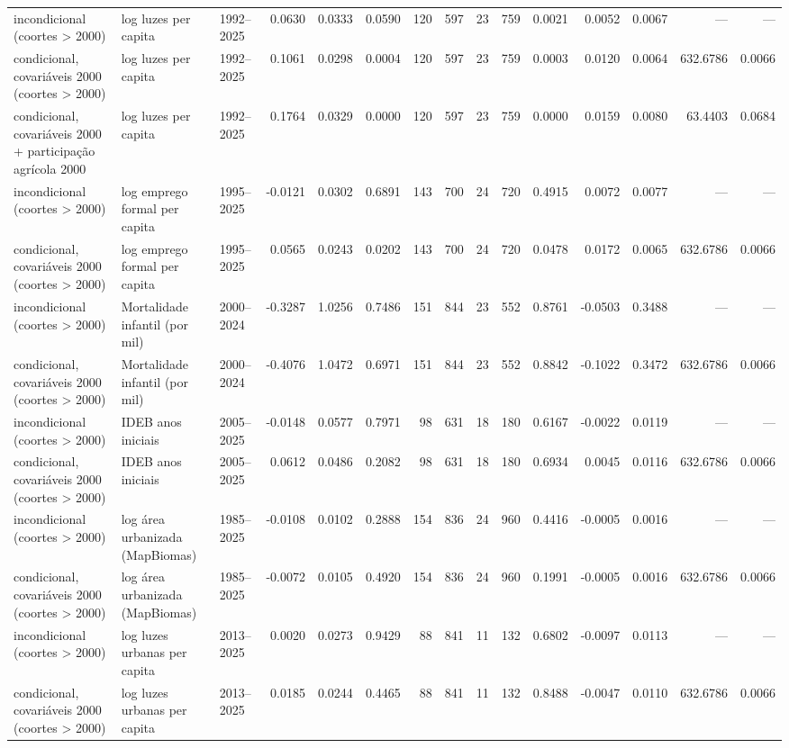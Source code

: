 \begin{table}
\begin{tabular}{lllrrrrrrrrrrrr}
incondicional (coortes > 2000) & log luzes per capita & 1992–2025 & 0.0630 & 0.0333 & 0.0590 & 120 & 597 & 23 & 759 & 0.0021 & 0.0052 & 0.0067 & — & — \\
condicional, covariáveis 2000 (coortes > 2000) & log luzes per capita & 1992–2025 & 0.1061 & 0.0298 & 0.0004 & 120 & 597 & 23 & 759 & 0.0003 & 0.0120 & 0.0064 & 632.6786 & 0.0066 \\
condicional, covariáveis 2000 + participação agrícola 2000 & log luzes per capita & 1992–2025 & 0.1764 & 0.0329 & 0.0000 & 120 & 597 & 23 & 759 & 0.0000 & 0.0159 & 0.0080 & 63.4403 & 0.0684 \\
incondicional (coortes > 2000) & log emprego formal per capita & 1995–2025 & -0.0121 & 0.0302 & 0.6891 & 143 & 700 & 24 & 720 & 0.4915 & 0.0072 & 0.0077 & — & — \\
condicional, covariáveis 2000 (coortes > 2000) & log emprego formal per capita & 1995–2025 & 0.0565 & 0.0243 & 0.0202 & 143 & 700 & 24 & 720 & 0.0478 & 0.0172 & 0.0065 & 632.6786 & 0.0066 \\
incondicional (coortes > 2000) & Mortalidade infantil (por mil) & 2000–2024 & -0.3287 & 1.0256 & 0.7486 & 151 & 844 & 23 & 552 & 0.8761 & -0.0503 & 0.3488 & — & — \\
condicional, covariáveis 2000 (coortes > 2000) & Mortalidade infantil (por mil) & 2000–2024 & -0.4076 & 1.0472 & 0.6971 & 151 & 844 & 23 & 552 & 0.8842 & -0.1022 & 0.3472 & 632.6786 & 0.0066 \\
incondicional (coortes > 2000) & IDEB anos iniciais & 2005–2025 & -0.0148 & 0.0577 & 0.7971 & 98 & 631 & 18 & 180 & 0.6167 & -0.0022 & 0.0119 & — & — \\
condicional, covariáveis 2000 (coortes > 2000) & IDEB anos iniciais & 2005–2025 & 0.0612 & 0.0486 & 0.2082 & 98 & 631 & 18 & 180 & 0.6934 & 0.0045 & 0.0116 & 632.6786 & 0.0066 \\
incondicional (coortes > 2000) & log área urbanizada (MapBiomas) & 1985–2025 & -0.0108 & 0.0102 & 0.2888 & 154 & 836 & 24 & 960 & 0.4416 & -0.0005 & 0.0016 & — & — \\
condicional, covariáveis 2000 (coortes > 2000) & log área urbanizada (MapBiomas) & 1985–2025 & -0.0072 & 0.0105 & 0.4920 & 154 & 836 & 24 & 960 & 0.1991 & -0.0005 & 0.0016 & 632.6786 & 0.0066 \\
incondicional (coortes > 2000) & log luzes urbanas per capita & 2013–2025 & 0.0020 & 0.0273 & 0.9429 & 88 & 841 & 11 & 132 & 0.6802 & -0.0097 & 0.0113 & — & — \\
condicional, covariáveis 2000 (coortes > 2000) & log luzes urbanas per capita & 2013–2025 & 0.0185 & 0.0244 & 0.4465 & 88 & 841 & 11 & 132 & 0.8488 & -0.0047 & 0.0110 & 632.6786 & 0.0066 \\

\end{tabular}
\end{table}
